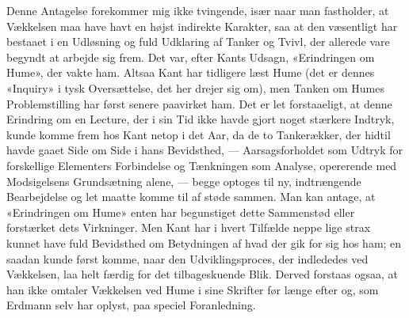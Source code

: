 \documentclass[12pt,a4paper]{article}
\begin{document}
Denne Antagelse forekommer mig ikke tvingende, især naar man fastholder,
at Vækkelsen maa have havt en højst indirekte Karakter, saa at den
væsentligt har bestaaet i en Udløsning og fuld Udklaring af Tanker og
Tvivl, der allerede vare begyndt at arbejde sig frem. Det var, efter
Kants Udsagn, «Erindringen om Hume», der vakte ham. Altsaa Kant har
tidligere læst Hume (det er dennes «Inquiry» i tysk Oversættelse, det her
drejer sig om), men Tanken om Humes Problemstilling har først senere
paavirket ham. Det er let forstaaeligt, at denne Erindring om en Lecture,
der i sin Tid ikke havde gjort noget stærkere Indtryk, kunde komme frem
hos Kant netop i det Aar, da de to Tankerækker, der hidtil havde gaaet
Side om Side i hans Bevidsthed, --- Aarsagsforholdet som Udtryk for
forskellige Elementers Forbindelse og Tænkningen som Analyse, opererende
med Modsigelsens Grundsætning alene, --- begge optoges til ny,
indtrængende Bearbejdelse og let maatte komme til af støde sammen. Man
kan antage, at «Erindringen om Hume» enten har begunstiget dette
Sammenstød eller forstærket dets Virkninger. Men Kant har i hvert Tilfælde
neppe lige strax kunnet have fuld Bevidsthed om Betydningen af hvad der
gik for sig hos ham; en saadan kunde først komme, naar den
Udviklingsproces, der indlededes ved Vækkelsen, laa helt færdig for det
tilbageskuende Blik. Derved forstaas ogsaa, at han ikke omtaler Vækkelsen
ved Hume i sine Skrifter før længe efter og, som Erdmann selv har oplyst,
paa speciel Foranledning.
\end{document}
